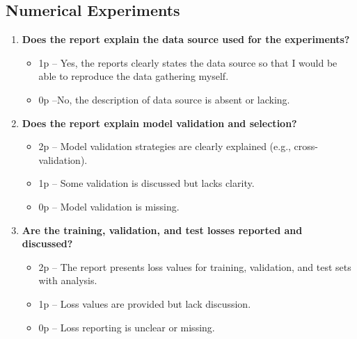 \documentclass{article}
\begin{document}
	\subsection{Numerical Experiments}
		\begin{enumerate}[resume]
		\item \textbf{Does the report explain the data source used for the experiments?}  
		\begin{itemize}
			\item 1p – Yes, the reports clearly states the data source so that I would be able 
			to reproduce the data gathering myself.
			\item 0p –No, the description of data source is absent or lacking. 
		\end{itemize}
		
		\item \textbf{Does the report explain model validation and selection?}  
		\begin{itemize}
			\item 2p – Model validation strategies are clearly explained (e.g., cross-validation).
			\item 1p – Some validation is discussed but lacks clarity.
			\item 0p – Model validation is missing.
		\end{itemize}
		
		\item \textbf{Are the training, validation, and test losses reported and discussed?}  
		\begin{itemize}
			\item 2p – The report presents loss values for training, validation, and test sets with analysis.
			\item 1p – Loss values are provided but lack discussion.
			\item 0p – Loss reporting is unclear or missing.
		\end{itemize}
	\end{enumerate}
	
\end{document}
